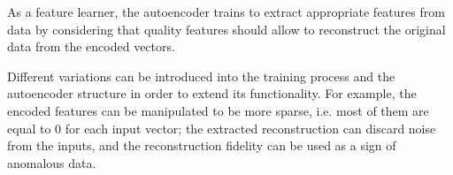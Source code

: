 As a feature learner, the autoencoder trains to extract appropriate features from data by considering that quality features should allow to reconstruct the original data from the encoded vectors.

Different variations can be introduced into the training process and the autoencoder structure in order to extend its functionality. For example, the encoded features can be manipulated to be more sparse, i.e. most of them are equal to 0 for each input vector; the extracted reconstruction can discard noise from the inputs, and the reconstruction fidelity can be used as a sign of anomalous data.
